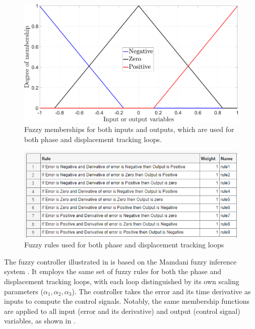\documentclass[lettersize,journal]{IEEEtran}
\begin{document}
\begin{figure}
    \centering    \includegraphics[width=\linewidth]{F_membership.png}
    \caption{Fuzzy memberships for both inputs and outputs, which are used for both phase and displacement tracking loops.}
    \label{F_fuzzy_memberships}
\end{figure}


\begin{figure}
    \centering    \includegraphics[width=\linewidth]{Fuzzy_rules.png}
    \caption{Fuzzy rules used for both phase and displacement tracking loops}
    \label{F_fuzzy_rules}
\end{figure}

The fuzzy controller illustrated in  is based on the Mamdani fuzzy inference system \cite{Ross2010}. It employs the same set of fuzzy rules for both the phase and displacement tracking loops, with each loop distinguished by its own scaling parameters ($\alpha_1, \alpha_2, \alpha_3$). The controller takes the error and its time derivative as inputs to compute the control signals. Notably, the same membership functions are applied to all input (error and its derivative) and output (control signal) variables, as shown in .
\end{document}
